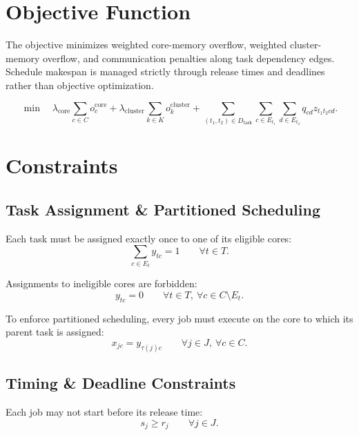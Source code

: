 \documentclass[11pt,a4paper]{article}
\begin{document}
\section{Objective Function}

The objective minimizes weighted core-memory overflow, weighted cluster-memory overflow, and communication penalties along task dependency edges. Schedule makespan is managed strictly through release times and deadlines rather than objective optimization.

\begin{equation}
\min
\quad
\lambda_{\mathrm{core}}
\sum_{c \in C} o_c^{\mathrm{core}}
+
\lambda_{\mathrm{cluster}}
\sum_{k \in K} o_k^{\mathrm{cluster}}
+
\sum_{(t_1,t_2)\in D_{\mathrm{task}}}
\sum_{c \in E_{t_1}}
\sum_{d \in E_{t_2}}
q_{cd} z_{t_1 t_2 cd}.
\end{equation}

\section{Constraints}

\subsection{Task Assignment \& Partitioned Scheduling}

Each task must be assigned exactly once to one of its eligible cores:
\begin{equation}
\sum_{c \in E_t} y_{tc} = 1
\qquad
\forall t \in T.
\end{equation}

Assignments to ineligible cores are forbidden:
\begin{equation}
y_{tc}=0
\qquad
\forall t \in T,\ \forall c \in C \setminus E_t.
\end{equation}

To enforce partitioned scheduling, every job must execute on the core to which its parent task is assigned:
\begin{equation}
x_{jc} = y_{\tau(j) c}
\qquad
\forall j \in J,\ \forall c \in C.
\end{equation}

\subsection{Timing \& Deadline Constraints}

Each job may not start before its release time:
\begin{equation}
s_j \geq r_j
\qquad
\forall j \in J.
\end{equation}
\end{document}
